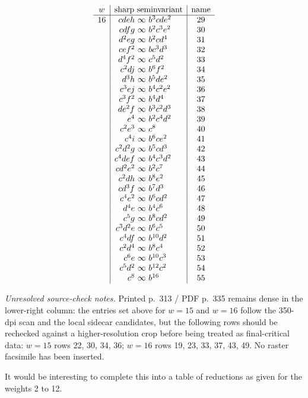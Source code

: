 \documentclass[11pt]{article}
\begin{document}
\[
\begin{array}{c|r@{\ }c@{\ }l|c}
w&\multicolumn{3}{c|}{\hbox{sharp seminvariant}}&\hbox{name}\\ \hline
16&cdeh&\infty&b^3cde^2&29\\
&cdfg&\infty&b^2c^3e^2&30\\
&d^2eg&\infty&b^2cd^4&31\\
&cef^2&\infty&bc^3d^3&32\\
&d^4f^2&\infty&c^5d^2&33\\
&c^2dj&\infty&b^6f^2&34\\
&d^3h&\infty&b^5de^2&35\\
&c^3ej&\infty&b^4c^2e^2&36\\
&c^3f^2&\infty&b^4d^4&37\\
&de^2f&\infty&b^3c^2d^3&38\\
&e^4&\infty&b^2c^4d^2&39\\
&c^2e^3&\infty&c^8&40\\
&c^4i&\infty&b^6ce^2&41\\
&c^2d^2g&\infty&b^5cd^3&42\\
&c^4def&\infty&b^4c^3d^2&43\\
&cd^2e^2&\infty&b^2c^7&44\\
&c^2dh&\infty&b^8e^2&45\\
&cd^3f&\infty&b^7d^3&46\\
&c^4e^2&\infty&b^6cd^2&47\\
&d^4e&\infty&b^4c^6&48\\
&c^5g&\infty&b^8cd^2&49\\
&c^3d^2e&\infty&b^6c^5&50\\
&c^4df&\infty&b^{10}d^2&51\\
&c^2d^4&\infty&b^8c^4&52\\
&c^6e&\infty&b^{10}c^3&53\\
&c^5d^2&\infty&b^{12}c^2&54\\
&c^8&\infty&b^{16}&55
\end{array}
\]

\noindent\textit{Unresolved source-check notes.}
Printed p.\ 313 / PDF p.\ 335 remains dense in the lower-right column: the entries set above for $w=15$ and $w=16$ follow the 350-dpi scan and the local sidecar candidates, but the following rows should be rechecked against a higher-resolution crop before being treated as final-critical data: $w=15$ rows 22, 30, 34, 36; $w=16$ rows 19, 23, 33, 37, 43, 49. No raster facsimile has been inserted.
\endgroup

\medskip
It would be interesting to complete this into a table of reductions as given for the weights 2 to 12.
\end{document}
